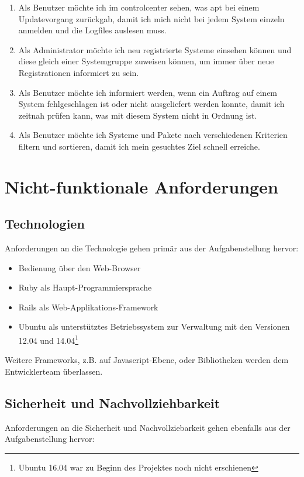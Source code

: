 \begin{enumerate}
    \item Als Benutzer möchte ich im \gls{controlcenter} sehen, was \gls{apt} bei einem Updatevorgang zurückgab, damit ich mich nicht bei jedem System einzeln anmelden und die Logfiles auslesen muss.
    \item Als Administrator möchte ich neu registrierte Systeme einsehen können und diese gleich einer Systemgruppe zuweisen können, um immer über neue Registrationen informiert zu sein.
    \item Als Benutzer möchte ich informiert werden, wenn ein Auftrag auf einem System fehlgeschlagen ist oder nicht ausgeliefert werden konnte, damit ich zeitnah prüfen kann, was mit diesem System nicht in Ordnung ist.
    \item Als Benutzer möchte ich Systeme und Pakete nach verschiedenen Kriterien filtern und sortieren, damit ich mein gesuchtes Ziel schnell erreiche.
\end{enumerate}

\clearpage
\section{Nicht-funktionale Anforderungen}
\begin{comment}
Alle NFA/Qualitätsattribute abgedeckt und testbar beschrieben
\end{comment}

\subsection*{Technologien}

Anforderungen an die Technologie gehen primär aus der Aufgabenstellung hervor:

\begin{itemize}
    \item Bedienung über den Web-Browser
    \item Ruby als Haupt-Programmiersprache
    \item Rails als Web-Applikations-Framework
    \item Ubuntu als unterstütztes Betriebssystem zur Verwaltung mit den Versionen 12.04 und 14.04\footnote{Ubuntu 16.04 war zu Beginn des Projektes noch nicht erschienen}
\end{itemize}

Weitere Frameworks, z.B. auf Javascript-Ebene, oder Bibliotheken werden dem Entwicklerteam überlassen.

\subsection*{Sicherheit und Nachvollziehbarkeit}
Anforderungen an die Sicherheit und Nachvollziebarkeit gehen ebenfalls aus der Aufgabenstellung hervor:

